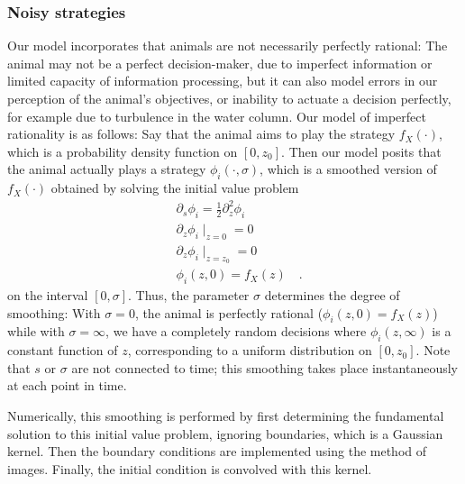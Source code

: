 


\subsubsection*{Noisy strategies}
Our model incorporates that animals are not necessarily perfectly rational: The animal may not be a perfect decision-maker, due to imperfect information or limited capacity of information processing, but it can also model errors in our perception of the animal's objectives, or inability to actuate a decision perfectly, for example due to turbulence in the water column. Our model of imperfect rationality is as follows: Say that the animal aims to play the strategy $f_X(\cdot)$, which is a probability density function on $[0,z_0]$. Then our model posits that the animal actually plays a strategy $\phi_i(\cdot ,\sigma)$, which is a smoothed version of $f_X(\cdot)$ obtained by solving the initial value problem
\begin{align}
  \label{eq:density_PDE}
  &\partial_s \phi_i = \frac{1}{2}\partial_z^2 \phi_i \\
  &\partial_z \phi_i \mid_{z=0} = 0 \\
  &\partial_z \phi_i \mid_{z = z_0} = 0 \\
  & \phi_i(z,0) = f_X(z) \quad .
\end{align}
on the interval $[0,\sigma]$. Thus, the parameter $\sigma$ determines the degree of smoothing: With $\sigma=0$, the animal is perfectly rational ($\phi_i(z,0)=f_X(z)$) while with $\sigma=\infty$, we have a completely random decisions where $\phi_i(z,\infty)$ is a constant function of $z$, corresponding to a uniform distribution on $[0,z_0]$. Note that $s$ or $\sigma$ are not connected to time; this smoothing takes place instantaneously at each point in time.

Numerically, this smoothing is performed by first determining the fundamental solution to this initial value problem, ignoring boundaries, which is a Gaussian kernel. Then the boundary conditions are implemented using the method of images. Finally, the initial condition is convolved with this kernel.



